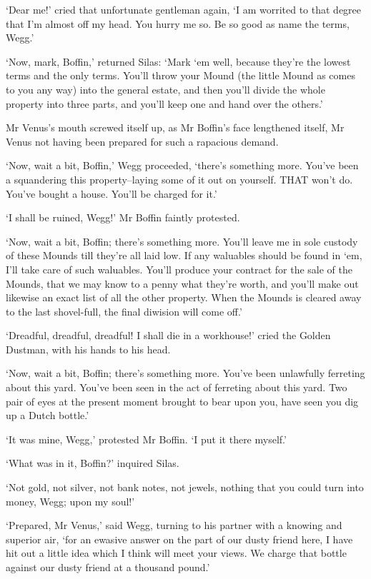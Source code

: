 ‘Dear me!’ cried that unfortunate gentleman again, ‘I am worrited to
that degree that I’m almost off my head. You hurry me so. Be so good as
name the terms, Wegg.’

‘Now, mark, Boffin,’ returned Silas: ‘Mark ‘em well, because they’re
the lowest terms and the only terms. You’ll throw your Mound (the little
Mound as comes to you any way) into the general estate, and then you’ll
divide the whole property into three parts, and you’ll keep one and hand
over the others.’

Mr Venus’s mouth screwed itself up, as Mr Boffin’s face lengthened
itself, Mr Venus not having been prepared for such a rapacious demand.

‘Now, wait a bit, Boffin,’ Wegg proceeded, ‘there’s something more.
You’ve been a squandering this property--laying some of it out on
yourself. THAT won’t do. You’ve bought a house. You’ll be charged for
it.’

‘I shall be ruined, Wegg!’ Mr Boffin faintly protested.

‘Now, wait a bit, Boffin; there’s something more. You’ll leave me in
sole custody of these Mounds till they’re all laid low. If any waluables
should be found in ‘em, I’ll take care of such waluables. You’ll produce
your contract for the sale of the Mounds, that we may know to a penny
what they’re worth, and you’ll make out likewise an exact list of
all the other property. When the Mounds is cleared away to the last
shovel-full, the final diwision will come off.’

‘Dreadful, dreadful, dreadful! I shall die in a workhouse!’ cried the
Golden Dustman, with his hands to his head.

‘Now, wait a bit, Boffin; there’s something more. You’ve been unlawfully
ferreting about this yard. You’ve been seen in the act of ferreting
about this yard. Two pair of eyes at the present moment brought to bear
upon you, have seen you dig up a Dutch bottle.’

‘It was mine, Wegg,’ protested Mr Boffin. ‘I put it there myself.’

‘What was in it, Boffin?’ inquired Silas.

‘Not gold, not silver, not bank notes, not jewels, nothing that you
could turn into money, Wegg; upon my soul!’

‘Prepared, Mr Venus,’ said Wegg, turning to his partner with a knowing
and superior air, ‘for an ewasive answer on the part of our dusty friend
here, I have hit out a little idea which I think will meet your views.
We charge that bottle against our dusty friend at a thousand pound.’

